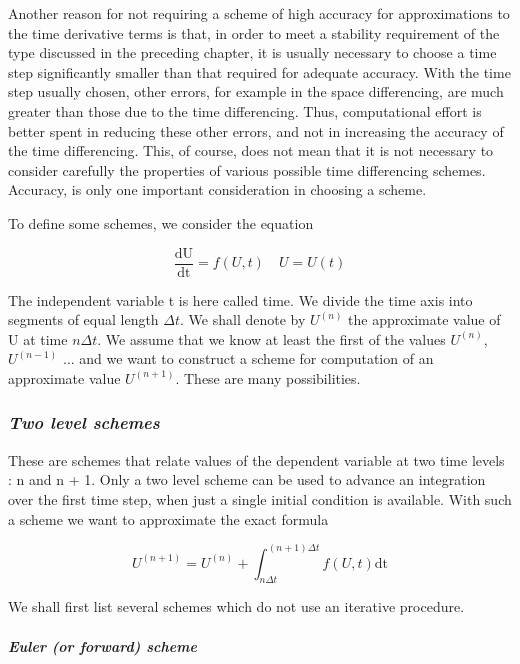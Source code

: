 Another reason for not requiring a scheme of high accuracy for
approximations to the time derivative terms is that, in order to meet a
stability requirement of the type discussed in the preceding chapter, it
is usually necessary to choose a time step significantly smaller than
that required for adequate accuracy. With the time step usually chosen,
other errors, for example in the space differencing, are much greater
than those due to the time differencing. Thus, computational effort is
better spent in reducing these other errors, and not in increasing the
accuracy of the time differencing. This, of course, does not mean that
it is not necessary to consider carefully the properties of various
possible time differencing schemes. Accuracy, is only one important
consideration in choosing a scheme.

To define some schemes, we consider the equation

{\[\frac{\text{dU}}{\text{dt}} = f( U,t) \quad  U = U(t)\]}

The independent variable t is here called time. We divide the time axis
into segments of equal length \(\Delta t\). We shall denote by
\(U^{\left( n \right)}\) the approximate value of U at time
\(n\Delta t\). We assume that we know at least the first of the values
\(U^{\left( n \right)}\), \(U^{\left( n - 1 \right)}\) ... and we want
to construct a scheme for computation of an approximate value
\(U^{\left( n + 1 \right)}\). These are many possibilities.

\subsubsection{\texorpdfstring{\emph{Two level
schemes}}{Two level schemes}}\label{two-level-schemes}

These are schemes that relate values of the dependent variable at two
time levels : n and n + 1. Only a two level scheme can be used to
advance an integration over the first time step, when just a single
initial condition is available. With such a scheme we want to
approximate the exact formula

{\[U^{( n + 1 )} = U^{\left( n \right)} + \int_{n\Delta t}^{(n+1)\Delta t}f\left( U,t \right)\text{dt}\]}

We shall first list several schemes which do not use an iterative
procedure.

\paragraph{\texorpdfstring{\emph{Euler (or forward)
scheme}}{Euler (or forward) scheme}}\label{euler-or-forward-scheme}

